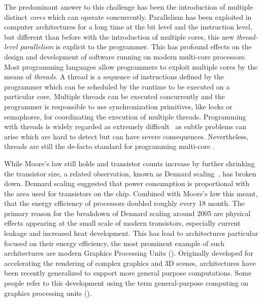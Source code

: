 The predominant answer to this challenge has been the introduction of multiple distinct \emph{cores} which can operate concurrently.
Parallelism has been exploited in computer architectures for a long time at the bit level and the instruction level, but different than before with the introduction of multiple cores, this new \emph{thread-level parallelism} is explicit to the programmer.
This has profound effects on the design and development of software running on modern multi-core processors.
Most programming languages allow programmers to exploit multiple cores by the means of \emph{threads}.
A thread is a sequence of instructions defined by the programmer which can be scheduled by the runtime to be executed on a particular core.
Multiple threads can be executed concurrently and the programmer is responsible to use synchronization primitives, like locks or semaphores, for coordinating the execution of multiple threads.
Programming with threads is widely regarded as extremely difficult~\cite{} as subtle problems can arise which are hard to detect but can have severe consequences.
Nevertheless, threads are still the de-facto standard for programming multi-core \CPUs.

\bigskip

\noindent
While Moore's law still holds and transistor counts increase by further shrinking the transistor size, a related observation, known as Dennard scaling~\cite{DennardRiBaLe1974}, has broken down.
Dennard scaling suggested that power consumption is proportional with the area used for transistors on the chip.
Combined with Moore's law this meant, that the energy efficiency of processors doubled roughly every 18 month.
The primary reason for the breakdown of Dennard scaling around 2005 are physical effects appearing at the small scale of modern transistors, especially current leakage and increased heat development.
This has lead to architectures particular focused on their energy efficiency, the most prominent example of such architectures are modern Graphics Processing Units (\GPUs).
Originally developed for accelerating the rendering of complex graphics and 3D scenes, \GPUs architectures have been recently generalized to support more general purpose computations.
Some people refer to this development using the term general-purpose computing on graphics processing units (\GPGPU).

